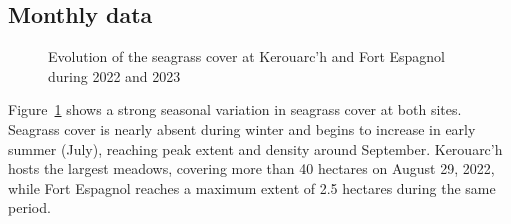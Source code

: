 \documentclass[
  number]{elsarticle}
\begin{document}
\subsection{Monthly data}\label{monthly-data}

\label{cell-fig-Pheno}
\begin{figure}[H]


\caption{\label{fig-Pheno}Evolution of the seagrass cover at Kerouarc'h
and Fort Espagnol during 2022 and 2023}

\end{figure}%

Figure~\ref{fig-Pheno} shows a strong seasonal variation in seagrass
cover at both sites. Seagrass cover is nearly absent during winter and
begins to increase in early summer (July), reaching peak extent and
density around September. Kerouarc'h hosts the largest meadows, covering
more than 40 hectares on August 29, 2022, while Fort Espagnol reaches a
maximum extent of 2.5 hectares during the same period.



\end{document}
